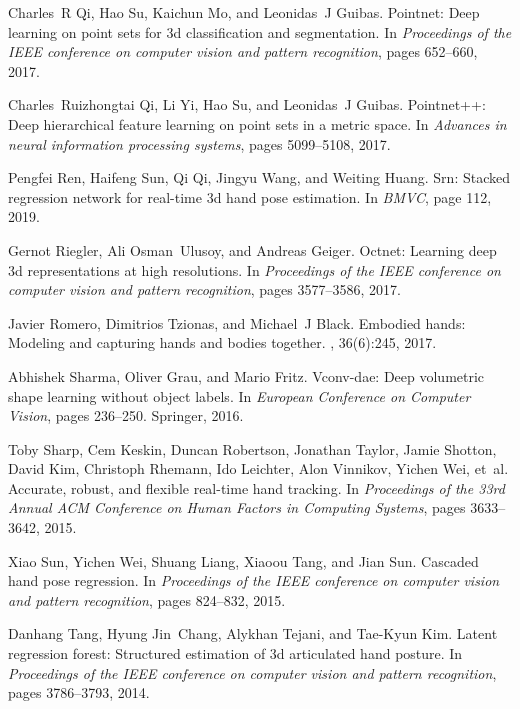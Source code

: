 \documentclass[10pt,twocolumn,letterpaper]{article}
\begin{document}
\begin{thebibliography}{10}
Charles~R Qi, Hao Su, Kaichun Mo, and Leonidas~J Guibas.
\newblock Pointnet: Deep learning on point sets for 3d classification and
  segmentation.
\newblock In {\em Proceedings of the IEEE conference on computer vision and
  pattern recognition}, pages 652--660, 2017.

Charles~Ruizhongtai Qi, Li Yi, Hao Su, and Leonidas~J Guibas.
\newblock Pointnet++: Deep hierarchical feature learning on point sets in a
  metric space.
\newblock In {\em Advances in neural information processing systems}, pages
  5099--5108, 2017.

Pengfei Ren, Haifeng Sun, Qi Qi, Jingyu Wang, and Weiting Huang.
\newblock Srn: Stacked regression network for real-time 3d hand pose
  estimation.
\newblock In {\em BMVC}, page 112, 2019.

Gernot Riegler, Ali Osman~Ulusoy, and Andreas Geiger.
\newblock Octnet: Learning deep 3d representations at high resolutions.
\newblock In {\em Proceedings of the IEEE conference on computer vision and
  pattern recognition}, pages 3577--3586, 2017.

Javier Romero, Dimitrios Tzionas, and Michael~J Black.
\newblock Embodied hands: Modeling and capturing hands and bodies together.
, 36(6):245, 2017.

Abhishek Sharma, Oliver Grau, and Mario Fritz.
\newblock Vconv-dae: Deep volumetric shape learning without object labels.
\newblock In {\em European Conference on Computer Vision}, pages 236--250.
  Springer, 2016.

Toby Sharp, Cem Keskin, Duncan Robertson, Jonathan Taylor, Jamie Shotton, David
  Kim, Christoph Rhemann, Ido Leichter, Alon Vinnikov, Yichen Wei, et~al.
\newblock Accurate, robust, and flexible real-time hand tracking.
\newblock In {\em Proceedings of the 33rd Annual ACM Conference on Human
  Factors in Computing Systems}, pages 3633--3642, 2015.

Xiao Sun, Yichen Wei, Shuang Liang, Xiaoou Tang, and Jian Sun.
\newblock Cascaded hand pose regression.
\newblock In {\em Proceedings of the IEEE conference on computer vision and
  pattern recognition}, pages 824--832, 2015.

Danhang Tang, Hyung Jin~Chang, Alykhan Tejani, and Tae-Kyun Kim.
\newblock Latent regression forest: Structured estimation of 3d articulated
  hand posture.
\newblock In {\em Proceedings of the IEEE conference on computer vision and
  pattern recognition}, pages 3786--3793, 2014.


\end{thebibliography}
\end{document}

